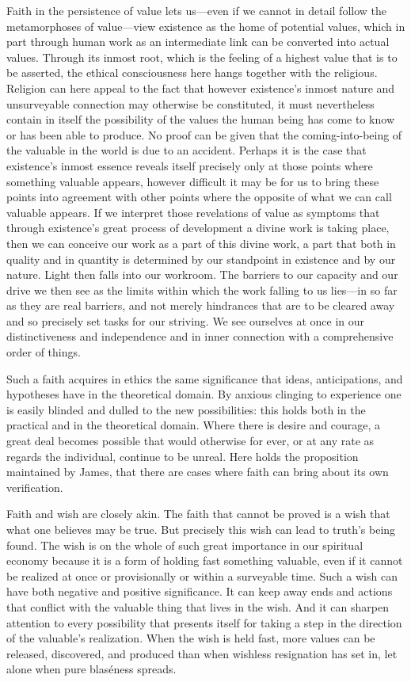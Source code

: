 \documentclass[12pt,a4paper]{book}
\newcommand{\opage}[1]{\marginnote{\footnotesize\textit{[#1]}}}
\begin{document}
Faith in the persistence of value lets us---even if we cannot in detail follow the metamorphoses of
value---view existence as the home of potential values, which in part through human work as an intermediate
link can be converted into actual values. Through its inmost root, which is the feeling of a highest value
that is to be asserted, the ethical consciousness here hangs together with the religious. Religion can here
appeal to the fact that however existence's inmost nature and unsurveyable connection may otherwise be
constituted, it must nevertheless contain in itself the possibility of the values the human being has come to
know or has been able to produce. No proof can be given that the coming-into-being of the valuable in the
world is due to an accident. Perhaps it is the case that existence's inmost essence reveals itself precisely
only at those points where something valuable appears, however difficult it may be for us to bring these
points into agreement with other points where the opposite of what we can call valuable appears. If we
interpret those revelations of value as symptoms that through existence's great process of development a
divine work is taking place, then we can conceive our work as a part of this divine work, a part that both in
quality and in quantity is determined by our standpoint in existence and by our nature. Light then falls 
\opage{222}into
our workroom. The barriers to our capacity and our drive we then see as the limits within which the work
falling to us lies---in so far as they are real barriers, and not merely hindrances that are to be cleared away
and so precisely set tasks for our striving. We see ourselves at once in our distinctiveness and independence
and in inner connection with a comprehensive order of things.

Such a faith acquires in ethics the same significance that ideas, anticipations, and hypotheses have in the
theoretical domain. By anxious clinging to experience one is easily blinded and dulled to the new
possibilities: this holds both in the practical and in the theoretical domain. Where there is desire and
courage, a great deal becomes possible that would otherwise for ever, or at any rate as regards the
individual, continue to be unreal. Here holds the proposition maintained by James, that there are cases where
faith can bring about its own verification.

Faith and wish are closely akin. The faith that cannot be proved is a wish that what one believes may be true.
But precisely this wish can lead to truth's being found. The wish is on the whole of such great importance in
our spiritual economy because it is a form of holding fast something valuable, even if it cannot be realized
at once or provisionally or within a surveyable time. Such a wish can have both negative and positive
significance. It can keep away ends and actions that conflict with the valuable thing that lives in the wish.
And it can sharpen attention to every possibility that presents itself for taking a step in the direction of
the valuable's realization. When the wish is held fast, more values can be released, discovered, and produced
than when wishless resignation has set in, let alone when pure blaséness spreads.
\end{document}
